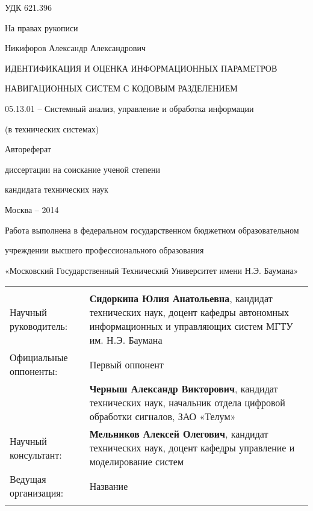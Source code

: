 \hfill{УДК 621.396}

\hfill На правах рукописи

\vspace{\baselineskip}
\vspace{\baselineskip}
\vspace{\baselineskip}
\vspace{\baselineskip}
\vspace{\baselineskip}

\noindent\centerline{Никифоров Александр Александрович}

\vspace{\baselineskip}
\vspace{\baselineskip}
\vspace{\baselineskip}

\noindent\centerline{ИДЕНТИФИКАЦИЯ И ОЦЕНКА ИНФОРМАЦИОННЫХ ПАРАМЕТРОВ}
\noindent\centerline{НАВИГАЦИОННЫХ СИСТЕМ С КОДОВЫМ РАЗДЕЛЕНИЕМ}

\vspace{\baselineskip}

\noindent\centerline{05.13.01 – Системный анализ, управление и обработка информации}
\noindent\centerline{(в технических системах)}

\vspace{\baselineskip}
\vspace{\baselineskip}

\noindent\centerline{Автореферат} 
\noindent\centerline{диссертации на соискание ученой степени}
\noindent\centerline{кандидата технических наук}


\vfill
\noindent\centerline{Москва – 2014}

\newpage

\noindent\centerline{Работа выполнена в федеральном государственном бюджетном образовательном}
\noindent\centerline{учреждении высшего профессионального образования}
\noindent\centerline{«Московский Государственный Технический Университет имени Н.Э. Баумана»}
\noindent\begin{tabular}{ p{6cm} p{10cm}}
			& \\
Научный руководитель:	& 	{\bf{Сидоркина Юлия Анатольевна}}, кандидат
       				технических наук, доцент кафедры автономных
				информационных и управляющих систем
				МГТУ им. Н.Э. Баумана \\
Официальные оппоненты: 	& Первый оппонент \\
       			&	{\bf{Черныш Александр Викторович}}, кандидат
       				технических наук, начальник отдела цифровой
      				обработки сигналов, ЗАО «Телум» \\
Научный консультант:	& {\bf{Мельников Алексей Олегович}}, кандидат
       				технических наук, доцент кафедры управление и
				моделирование систем\\
Ведущая организация:	&	Название \\
			& \\
\end{tabular}

